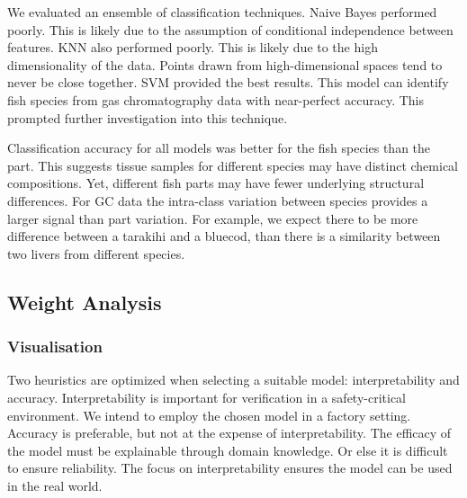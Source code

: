 \documentclass[runningheads]{llncs}
\begin{document}
We evaluated an ensemble of classification techniques.
Naive Bayes performed poorly.
This is likely due to the assumption of conditional independence between features.
KNN also performed poorly. This is likely due to the high dimensionality of the data.
Points drawn from high-dimensional spaces tend to never be close together.
SVM provided the best results.
This model can identify fish species from gas chromatography data with near-perfect accuracy.
This prompted further investigation into this technique.

Classification accuracy for all models was better for the fish species than the part.
This suggests tissue samples for different species may have distinct chemical compositions.
Yet, different fish parts may have fewer underlying structural differences.
For GC data the intra-class variation between species provides a larger signal than part variation.
For example, we expect there to be more difference between a tarakihi and a bluecod, than there is a similarity between two livers from different species.

\subsection{Weight Analysis}


\subsubsection{Visualisation}
\label{sec:visualisation}


Two heuristics are optimized when selecting a suitable model: interpretability and accuracy. 
Interpretability is important for verification in a safety-critical environment.
We intend to employ the chosen model in a factory setting.
Accuracy is preferable, but not at the expense of interpretability.
The efficacy of the model must be explainable through domain knowledge.
Or else it is difficult to ensure reliability.
The focus on interpretability ensures the model can be used in the real world.
\end{document}
